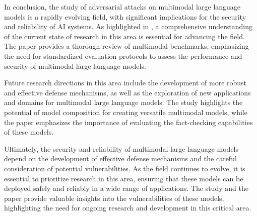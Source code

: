\documentclass[11pt,a4paper]{article}
\begin{document}
In conclusion, the study of adversarial attacks on multimodal large language models is a rapidly evolving field, with significant implications for the security and reliability of AI systems. As highlighted in \cite{arxiv:2409.18991}, a comprehensive understanding of the current state of research in this area is essential for advancing the field. The \cite{arxiv:2409.18142} paper provides a thorough review of multimodal benchmarks, emphasizing the need for standardized evaluation protocols to assess the performance and security of multimodal large language models.

Future research directions in this area include the development of more robust and effective defense mechanisms, as well as the exploration of new applications and domains for multimodal large language models. The \cite{arxiv:2401.13601} study highlights the potential of model composition for creating versatile multimodal models, while the \cite{arxiv:2403.03627} paper emphasizes the importance of evaluating the fact-checking capabilities of these models.

Ultimately, the security and reliability of multimodal large language models depend on the development of effective defense mechanisms and the careful consideration of potential vulnerabilities. As the field continues to evolve, it is essential to prioritize research in this area, ensuring that these models can be deployed safely and reliably in a wide range of applications. The \cite{arxiv:2402.02309} study and the \cite{arxiv:2405.09981} paper provide valuable insights into the vulnerabilities of these models, highlighting the need for ongoing research and development in this critical area.
\end{document}
